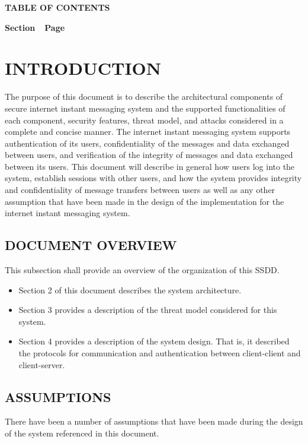 \documentclass[twoside,letterpaper]{article}
\begin{document}
{\centering{}\bfseries\color{black}
TABLE OF CONTENTS
\par}

{\bfseries\color{black}
Section\ \ Page}

\setcounter{tocdepth}{9}
\renewcommand\contentsname{}
\tableofcontents

\bigskip

\bigskip
\clearpage\setcounter{page}{1}\pagestyle{Standard}
\section{INTRODUCTION}
The purpose of this document is to describe the architectural components of secure internet instant 
messaging system and the supported functionalities of each component, security features, 
threat model, and attacks considered in a complete and concise manner. 
The internet instant messaging system supports authentication of its users, 
confidentiality of the messages and data exchanged between users, and 
verification of the integrity of messages and data exchanged between its users. 
This document will describe in general how users log into the system, establish
 sessions with other users, and how the system provides integrity and confidentiality 
 of message transfers between users as well as any other assumption that 
 have been made in the design of the implementation for the internet instant 
 messaging system.

\bigskip

\subsection{DOCUMENT OVERVIEW}
This subsection shall provide an overview of the organization of this
SSDD.

\begin{itemize}
\item Section 2 of this document describes the system architecture.
\item Section 3 provides a description of the threat model considered for this system.
\item Section 4 provides a description of the system design. That is, it described the protocols for communication
and authentication between client-client and client-server.
\end{itemize}

\bigskip

\subsection{ASSUMPTIONS}
There have been a number of assumptions that have been made during the design of the system referenced in this document.
\end{document}
